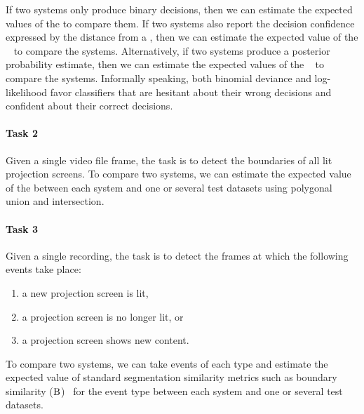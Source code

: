 If two systems only produce binary decisions, then we can estimate the expected
values of the  to compare them. If two systems
also report the decision confidence expressed by the distance from a
, then we can estimate the expected value of the
~\cite[sec.~10.6]{friedman2001elements} to compare the
systems. Alternatively, if two systems produce a posterior probability
estimate, then we can estimate the expected values of the
~\cite[sec.~2.6.3]{friedman2001elements} to compare the
systems.
Informally speaking, both binomial deviance and log-likelihood favor
classifiers that are hesitant about their wrong decisions and confident about
their correct decisions.

\paragraph{Task 2} Given a single video file frame, the task is to detect the
boundaries of all lit projection screens. To compare two systems, we can
estimate the expected value of the  between each system and
one or several test datasets using polygonal union and intersection.

\paragraph{Task 3} Given a single recording, the task is to detect the frames
at which the following events take place:
\begin{enumerate}
  \item a new projection screen is lit,
  \item a projection screen is no longer lit, or
  \item a projection screen shows new content.
\end{enumerate}
To compare two systems, we can take events of each type and estimate the
expected value of standard segmentation similarity metrics such as boundary
similarity ($\textrm B$)~\cite{P13-1167} for the event type between each system
and one or several test datasets.

